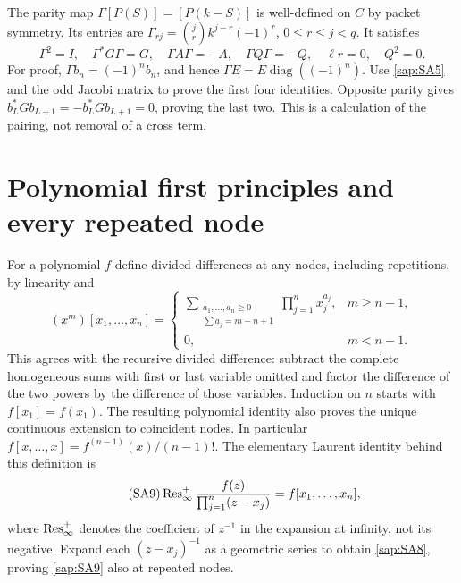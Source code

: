 \documentclass[11pt]{article}
\begin{document}
The parity map $\Gamma[P(S)]=[P(k-S)]$ is well-defined
on $C$ by packet symmetry. Its entries are
$\Gamma_{rj}=\binom jr k^{j-r}(-1)^r$, $0\leq r\leq j<q$.
It satisfies
\begin{equation}\tag{SA7}\label{sap:SA7}
\Gamma^2=I,\quad \Gamma^*G\Gamma=G,\quad
\Gamma A\Gamma=-A,\quad \Gamma Q\Gamma=-Q,\quad
\ell r=0,\quad Q^2=0.
\end{equation}
For proof, $\Gamma b_n=(-1)^nb_n$, and hence
$\Gamma E=E\operatorname{diag}((-1)^n)$.
Use \eqref{sap:SA5} and the odd Jacobi matrix to prove the
first four identities. Opposite parity gives
$b_L^*Gb_{L+1}=-b_L^*Gb_{L+1}=0$, proving the last two.
This is a calculation of the pairing, not removal of a
cross term.

\section{Polynomial first principles and every repeated node}

For a polynomial $f$ define divided differences at any
nodes, including repetitions, by linearity and
\begin{equation}\tag{SA8}\label{sap:SA8}
(x^m)[x_1,\ldots,x_n]=
\begin{cases}
\displaystyle\sum_{\substack{a_1,\ldots,a_n\geq0\\
 \sum a_j=m-n+1}}\prod_{j=1}^n x_j^{a_j},&m\geq n-1,\\
0,&m<n-1.
\end{cases}
\end{equation}
This agrees with the recursive divided difference:
subtract the complete homogeneous sums with first or last
variable omitted and factor the difference of the two
powers by the difference of those variables. Induction
on $n$ starts with $f[x_1]=f(x_1)$.
The resulting polynomial identity also proves the unique
continuous extension to coincident nodes. In particular
$f[x,\ldots,x]=f^{(n-1)}(x)/(n-1)!$.
The elementary Laurent identity behind this definition is
\begin{equation}\tag{SA9}\label{sap:SA9}
\operatorname{Res}_\infty^+\frac{f(z)}
 {\prod_{j=1}^n(z-x_j)}
=f[x_1,\ldots,x_n],
\end{equation}
where $\operatorname{Res}_\infty^+$ denotes the coefficient of $z^{-1}$
in the expansion at infinity, not its negative.
Expand each $(z-x_j)^{-1}$ as a geometric series to obtain
\eqref{sap:SA8}, proving \eqref{sap:SA9} also at repeated nodes.
\end{document}
